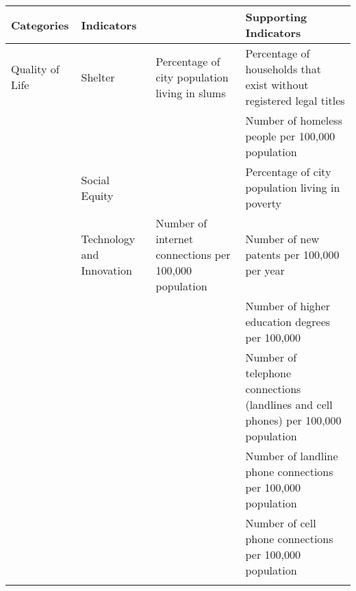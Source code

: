 \begin{landscape}
\begin{table}[th]
\begin{center}
\begin{tabular}{ >{\raggedright\arraybackslash}p{} >{\raggedright\arraybackslash}p{} >{\raggedright\arraybackslash}p{} >{\raggedright\arraybackslash}p{} } 
\hline
Categories & Indicators &  & Supporting Indicators \\
\hline
Quality of Life & Shelter & Percentage of city population living in slums & Percentage of households that exist without registered legal titles \\
  &  &  & Number of homeless people per 100,000 population \linebreak \\
  & Social Equity &  & Percentage of city population living in poverty \\
  & Technology and Innovation & Number of internet connections per 100,000 population & Number of new patents per 100,000 per year \\
  &  &  & Number of higher education degrees per 100,000 \\
  &  &  & Number of telephone connections (landlines and cell phones) per 100,000 population \\
  &  &  & Number of landline phone connections per 100,000 population \\
  &  &  & Number of cell phone connections per 100,000 population \\
\hline
\label{tbl:globalCityIndicatorsFacility5}
\end{tabular}
\end{center}
\end{table}

\end{landscape}